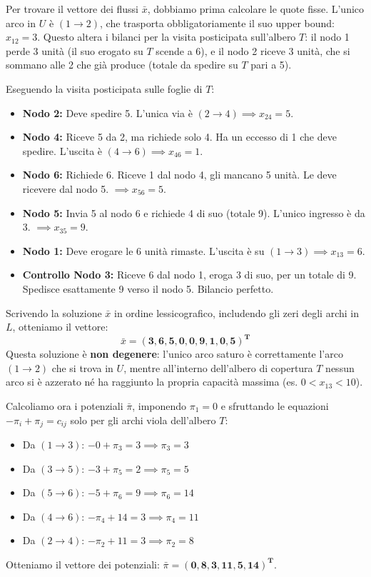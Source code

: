 \documentclass[12pt, a4paper]{article}
\begin{document}
	Per trovare il vettore dei flussi $\bar{x}$, dobbiamo prima calcolare le quote fisse. L'unico arco in $U$ è $(1\to2)$, che trasporta obbligatoriamente il suo upper bound: $x_{12} = 3$. Questo altera i bilanci per la visita posticipata sull'albero $T$: il nodo 1 perde 3 unità (il suo erogato su $T$ scende a 6), e il nodo 2 riceve 3 unità, che si sommano alle 2 che già produce (totale da spedire su $T$ pari a 5).
	
	Eseguendo la visita posticipata sulle foglie di $T$:
	\begin{itemize}
		\item \textbf{Nodo 2:} Deve spedire 5. L'unica via è $(2\to4) \implies x_{24} = 5$.
		\item \textbf{Nodo 4:} Riceve 5 da 2, ma richiede solo 4. Ha un eccesso di 1 che deve spedire. L'uscita è $(4\to6) \implies x_{46} = 1$.
		\item \textbf{Nodo 6:} Richiede 6. Riceve 1 dal nodo 4, gli mancano 5 unità. Le deve ricevere dal nodo 5. $\implies x_{56} = 5$.
		\item \textbf{Nodo 5:} Invia 5 al nodo 6 e richiede 4 di suo (totale 9). L'unico ingresso è da 3. $\implies x_{35} = 9$.
		\item \textbf{Nodo 1:} Deve erogare le 6 unità rimaste. L'uscita è su $(1\to3) \implies x_{13} = 6$.
		\item \textbf{Controllo Nodo 3:} Riceve 6 dal nodo 1, eroga 3 di suo, per un totale di 9. Spedisce esattamente 9 verso il nodo 5. Bilancio perfetto.
	\end{itemize}
	
	Scrivendo la soluzione $\bar{x}$ in ordine lessicografico, includendo gli zeri degli archi in $L$, otteniamo il vettore: 
	\[ \bar{x} = \mathbf{(3, 6, 5, 0, 0, 9, 1, 0, 5)^T} \]
	Questa soluzione è \textbf{non degenere}: l'unico arco saturo è correttamente l'arco $(1\to2)$ che si trova in $U$, mentre all'interno dell'albero di copertura $T$ nessun arco si è azzerato né ha raggiunto la propria capacità massima (es. $0 < x_{13} < 10$). 
	
	Calcoliamo ora i potenziali $\bar{\pi}$, imponendo $\pi_1 = 0$ e sfruttando le equazioni $-\pi_i + \pi_j = c_{ij}$ solo per gli archi viola dell'albero $T$:
	\begin{itemize}
		\item Da $(1\to3)$: $-0 + \pi_3 = 3 \implies \pi_3 = 3$
		\item Da $(3\to5)$: $-3 + \pi_5 = 2 \implies \pi_5 = 5$
		\item Da $(5\to6)$: $-5 + \pi_6 = 9 \implies \pi_6 = 14$
		\item Da $(4\to6)$: $-\pi_4 + 14 = 3 \implies \pi_4 = 11$
		\item Da $(2\to4)$: $-\pi_2 + 11 = 3 \implies \pi_2 = 8$
	\end{itemize}
	Otteniamo il vettore dei potenziali: $\bar{\pi} = \mathbf{(0, 8, 3, 11, 5, 14)^T}$. 
	
\end{document}
